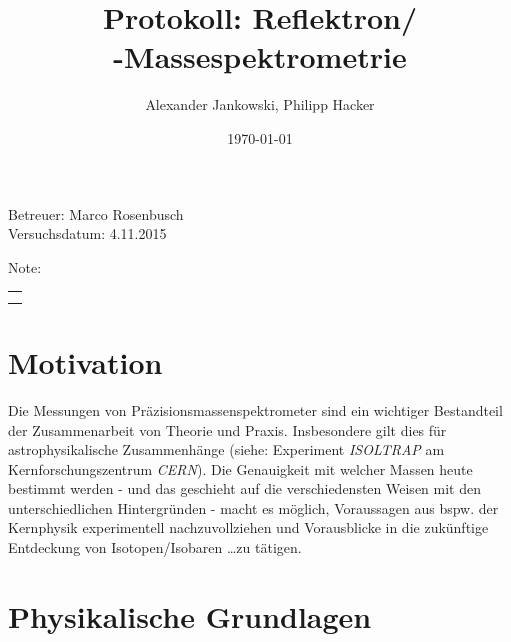 \documentclass[numbers=noenddot,a4paper,notitlepage,twoside,BCOR15mm]{scrartcl}
\title{Protokoll: Reflektron/\\\tilt{time of flight}-Massespektrometrie} %
\author{Alexander Jankowski, Philipp Hacker}
\date{\today}
\newcommand{\tilt}[1]{\textit{#1}}
\begin{document}
	\maketitle
	\begin{center}
		Betreuer: Marco Rosenbusch \\ %
		Versuchsdatum: 4.11.2015 \\ %
		\begin{table}[h]
			\centering
			Note: %
			\begin{tabularx}{1.5cm}{|X|}
				\hline \\ \\
				\hline
			\end{tabularx}
		\end{table}
	\end{center}
	\vspace*{\fill}
	\tableofcontents
	\vfill
	\newpage
	\section{Motivation}

		Die Messungen von Präzisionsmassenspektrometer sind ein wichtiger Bestandteil der Zusammenarbeit von Theorie und Praxis. Insbesondere gilt dies für astrophysikalische Zusammenhänge (siehe: Experiment \tilt{ISOLTRAP} am Kernforschungszentrum \tilt{CERN}). Die Genauigkeit mit welcher Massen heute bestimmt werden - und das geschieht auf die verschiedensten Weisen mit den unterschiedlichen Hintergründen - macht es möglich, Voraussagen aus bspw. der Kernphysik experimentell nachzuvollziehen und Vorausblicke in die zukünftige Entdeckung von Isotopen/Isobaren \dots zu tätigen.

	\newpage
	\section{Physikalische Grundlagen}
\end{document}
